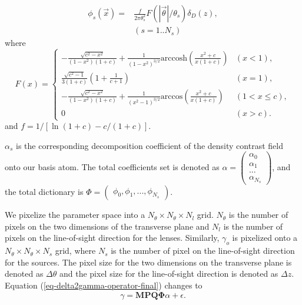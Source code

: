 \documentclass[twocolumn]{aastex62}
\begin{document}
\begin{equation}
\begin{split}
\phi_s(\vec{x}) =&\frac{f }{2 \pi \theta_s^2 } F(|\vec{\theta}|/\theta_s) \delta_D(z),\\
&  (s=1..N_s)
\end{split}
\end{equation}
where
\begin{equation}
F(x)=
\begin{cases}
-\frac{\sqrt{c^2-x^2}}{(1-x^2)(1+c)} + \frac{1}{(1-x^2)^{3/2}} \mathrm{arccosh} (\frac{x^2+c}{x(1+c)}) & (x<1),\\
\frac{\sqrt{c^2-1}}{3(1+c)} (1+\frac{1}{c+1}) & (x=1),\\
-\frac{\sqrt{c^2-x^2}}{(1-x^2)(1+c)} + \frac{1}{(x^2-1)^{3/2}} \mathrm{arccos} (\frac{x^2+c}{x(1+c)}) & (1<x\leq c),\\
0& (x>c).
\end{cases}
\end{equation}
and $f=1/[\ln (1+c)-c/(1+c)]$.

$\alpha_s$ is the corresponding decomposition coefficient of the density contrast field onto our basis atom. The total coefficients set is denoted as $\alpha=\begin{pmatrix}
\alpha_0\\
\alpha_1\\
...\\
\alpha_{N_s}
\end{pmatrix}$, and the total dictionary is $\Phi=\begin{pmatrix}
\phi_0, \phi_1, ..., \phi_{N_s}
\end{pmatrix}$.

We pixelize the parameter space into a $N_\theta \times N_\theta \times N_l$ grid. $N_\theta$ is the number of pixels on the two dimensions of the transverse plane and $N_l$ is the number of pixels on the line-of-sight direction for the lenses. Similarly, $\gamma_o$ is pixelized onto a $N_\theta \times N_\theta \times N_s$ grid, where $N_s$ is the number of pixel on the line-of-sight direction for the sources.
The pixel size for the two dimensions on the transverse plane is denoted as $\Delta \theta$ and the pixel size for the line-of-sight direction is denoted as $\Delta z$.
Equation (\ref{eq-delta2gamma-operator-final}) changes to
\begin{equation}\label{eq-alpha2gamma-operator}
\gamma=\mathbf{M}\mathbf{P}\mathbf{Q}\mathbf{\Phi} \alpha +\epsilon.
\end{equation}
\end{document}
